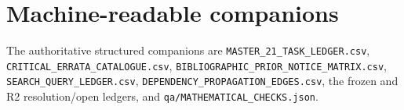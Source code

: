 \documentclass[
  10pt,
  a4paper,
]{scrreprt}
\begin{document}
\section{Machine-readable companions}\label{machine-readable-companions}

The authoritative structured companions are
\texttt{MASTER\_21\_TASK\_LEDGER.csv},
\texttt{CRITICAL\_ERRATA\_CATALOGUE.csv},
\texttt{BIBLIOGRAPHIC\_PRIOR\_NOTICE\_MATRIX.csv},
\texttt{SEARCH\_QUERY\_LEDGER.csv},
\texttt{DEPENDENCY\_PROPAGATION\_EDGES.csv}, the frozen and R2
resolution/open ledgers, and \texttt{qa/MATHEMATICAL\_CHECKS.json}.
\end{document}
